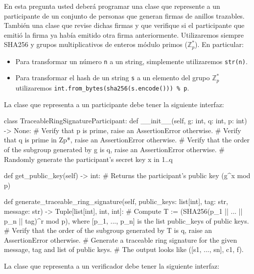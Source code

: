 
\text{[2 puntos]} En esta pregunta usted deberá programar una clase que represente a un participante de un conjunto de personas que generan firmas de anillos trazables. También una clase que revise dichas firmas y que verifique si el participante que emitió la firma ya había emitido otra firma anteriormente. Utilizaremos siempre SHA256 y grupos multiplicativos de enteros módulo primos ($\mathbb{Z}_p^*$). En particular:

\begin{itemize}
	\item Para transformar un número \texttt{n} a un string, simplemente utilizaremos \texttt{str(n)}.
	\item Para transformar el hash de un string \texttt{s} a un elemento del grupo $\mathbb{Z}_p^*$ utilizaremos \texttt{int.from\_bytes(sha256(s.encode())) \% p}.
\end{itemize}

La clase que representa a un participante debe tener la siguiente interfaz:

\begin{python}
class TraceableRingSignatureParticipant:
	def __init__(self, g: int, q: int, p: int) -> None:
		# Verify that p is prime, raise an AssertionError otherwise.
		# Verify that q is prime in Zp*, raise an AssertionError otherwise.
		# Verify that the order of the subgroup generated by g is q, raise an AssertionError otherwise.
		# Randomly generate the participant's secret key x in {1..q}

	def get_public_key(self) -> int:
		# Returns the participant's public key (g^x mod p)

	def generate_traceable_ring_signature(self, public_keys: list[int], tag: str, message: str) -> Tuple[list[int], int, int]:
		# Compute T := (SHA256(p_1 || ... || p_n || tag)^r mod p), where [p_1, ..., p_n] is the list public_keys of public keys.
		# Verify that the order of the subgroup generated by T is q, raise an AssertionError otherwise.
		# Generate a traceable ring signature for the given message, tag and list of public keys.
		# The output looks like ([s1, ..., sn], c1, f).

\end{python}

La clase que representa a un verificador debe tener la siguiente interfaz:

